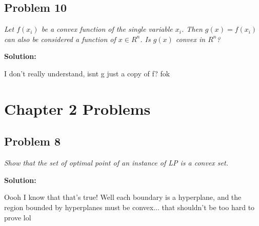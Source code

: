\documentclass[11pt, a4paper]{article}
\newcommand{\solution}{ \noindent \textbf{Solution:}}
\newcommand{\problem}[1]{\textit{#1} \medskip}
\begin{document}
\subsection*{Problem 10}

\problem{Let $f(x_i)$ be a convex function of the single variable $x_i$. Then $g(x) = f(x_i)$ can also
be considered a function of $x \in R^n$. Is $g(x)$ convex in $R^n$?}

\solution

I don't really understand, isnt g just a copy of f? fok

\section*{Chapter 2 Problems}

\subsection*{Problem 8}

\problem{Show that the set of optimal point of an instance of LP is a convex set.}

\solution

Oooh I know that that's true! Well each boundary is a hyperplane, and the region bounded by
hyperplanes must be convex... that shouldn't be too hard to prove lol
\end{document}
